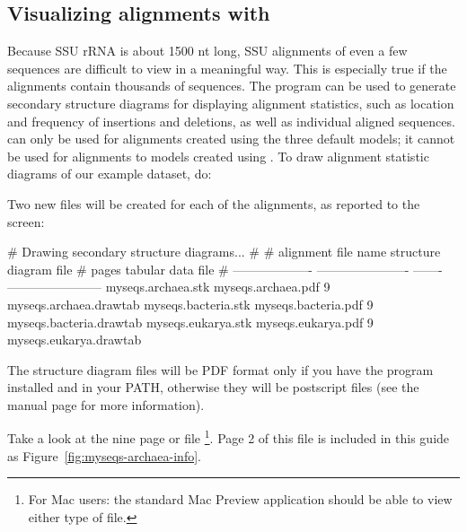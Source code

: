 \subsection{Visualizing alignments with }

Because SSU rRNA is about 1500 nt long, SSU alignments of even a few
sequences are difficult to view in a meaningful way. This is
especially true if the alignments contain thousands of sequences.
The  program can be used to generate secondary
structure diagrams for displaying alignment statistics, such as
location and frequency of insertions and deletions, as well as
individual aligned sequences.  can only be used for
alignments created using the three default models; it cannot
be used for alignments to models created using .
To draw alignment statistic diagrams of our  example
dataset, do:


Two new files will be created for each of the alignments, as reported
to the screen:

\begin{sreoutput}
# Drawing secondary structure diagrams...
#
# alignment file name  structure diagram file  # pages  tabular data file      
# -------------------  ----------------------  -------  -----------------------
  myseqs.archaea.stk   myseqs.archaea.pdf            9  myseqs.archaea.drawtab 
  myseqs.bacteria.stk  myseqs.bacteria.pdf           9  myseqs.bacteria.drawtab
  myseqs.eukarya.stk   myseqs.eukarya.pdf            9  myseqs.eukarya.drawtab 
\end{sreoutput}

The structure diagram files will be PDF format only if you have the
program  installed and in your PATH, otherwise they will
be postscript files (see the  manual page for more
information). 

Take a look at the nine page  or
 file \footnote{For Mac users: the standard
  Mac Preview application should be able to view either type of
  file.}.  Page 2 of this file is included in this guide as
Figure~\ref{fig:myseqs-archaea-info}.


